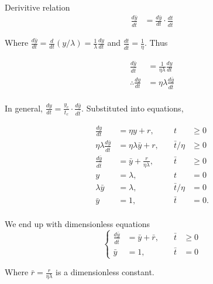 \documentclass[12pt]{article}
\begin{document}
Derivitive relation
\begin{equation}
  \begin{aligned}
    \frac{d\bar{y}}{d\bar{t}} &= \frac{d\bar{y}}{dt} \cdot \frac{dt}{d\bar{t}}
  \end{aligned}
\end{equation}

Where $\frac{d\bar{y}}{dt} = \frac{d}{dt}(y/\lambda) = \frac{1}{\lambda}\frac{dy}{dt}$ and
$\frac{dt}{d\bar{t}} = \frac{1}{\eta}$. Thus

\begin{equation}
  \begin{aligned}
    \frac{d\bar{y}}{d\bar{t}} &= \frac{1}{\eta\lambda}\frac{dy}{dt} \\
    \therefore \frac{dy}{dt} &= \eta\lambda\frac{d\bar{y}}{d\bar{t}} \\
  \end{aligned}
\end{equation}

In general, $\frac{dy}{dt} = \frac{y_c}{t_c} \cdot \frac{d\bar{y}}{d\bar{t}}$.
Substituted into equations,

\begin{equation}
  \begin{aligned}
    \frac{dy}{dt} &= \eta y+r, &\quad t&\ge0 \\
    \eta\lambda\frac{d\bar{y}}{d\bar{t}} &= \eta\lambda\bar{y}+r, &\quad \bar{t}/\eta&\ge0 \\
    \frac{d\bar{y}}{d\bar{t}} &= \bar{y}+\frac{r}{\eta\lambda}, &\quad \bar{t}&\ge0 \\
    y &= \lambda, &\quad t&=0 \\
    \lambda\bar{y} &= \lambda, &\quad \bar{t}/\eta &= 0 \\
    \bar{y} &= 1, &\quad\bar{t}&=0. \\
  \end{aligned}
\end{equation}

We end up with dimensionless equations
\begin{equation} \left\{
  \begin{aligned}
    \frac{d\bar{y}}{d\bar{t}} &= \bar{y} + \bar{r}, &\quad \bar{t}&\ge0 \\
    \bar{y} &= 1, &\quad \bar{t} &= 0
  \end{aligned} \right.
\end{equation}

Where $\bar{r} = \frac{r}{\eta\lambda}$ is a dimensionless constant.
\end{document}

